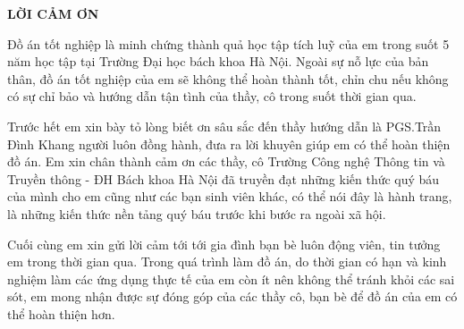 \documentclass[../DoAn.tex]{subfiles}
\begin{document}
\begin{center}
    \Large{\textbf{LỜI CẢM ƠN}}\\
\end{center}
\vspace{1cm}
Đồ án tốt nghiệp là minh chứng thành quả học tập tích luỹ của em trong suốt 5 năm học tập tại Trường Đại học bách khoa Hà Nội. Ngoài sự nỗ lực của bản thân, đồ án tốt nghiệp của em sẽ không thể hoàn thành tốt, chỉn chu nếu không có sự chỉ bảo và hướng dẫn tận tình của thầy, cô trong suốt thời gian qua.

Trước hết em xin bày tỏ lòng biết ơn sâu sắc đến thầy hướng dẫn là PGS.Trần Đình Khang người luôn đồng hành, đưa ra lời khuyên giúp em có thể hoàn thiện đồ án. Em xin chân thành cảm ơn các thầy, cô Trường Công nghệ Thông tin và Truyền thông - ĐH Bách khoa Hà Nội đã truyền đạt những kiến thức quý báu của mình cho em cũng như các bạn sinh viên khác, có thể nói đây là hành trang, là những kiến thức nền tảng quý báu trước khi bước ra ngoài xã hội.

Cuối cùng em xin gửi lời cảm tới tới gia đình bạn bè luôn động viên, tin tưởng em trong thời gian qua. Trong quá trình làm đồ án, do thời gian có hạn và kinh nghiệm làm các ứng dụng thực tế của em còn ít nên không thể tránh khỏi các sai sót, em mong nhận được sự đóng góp của các thầy cô, bạn bè để đồ án của em có thể hoàn thiện hơn. 
\end{document}
